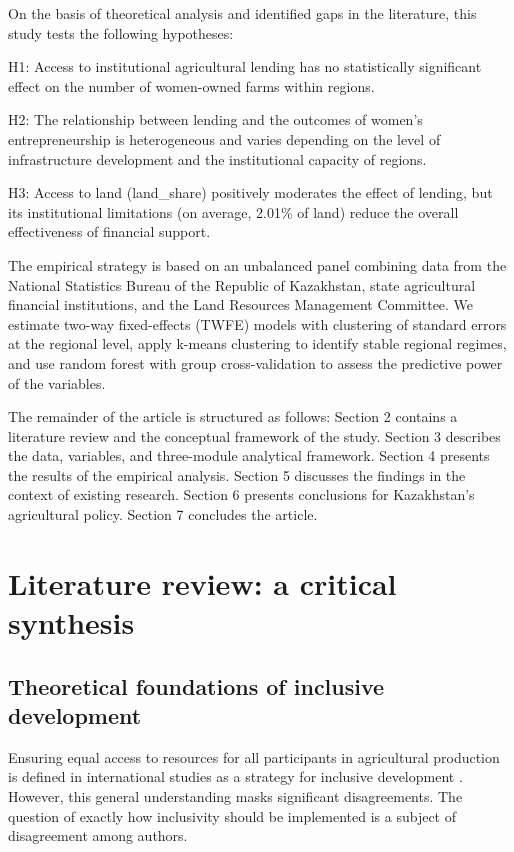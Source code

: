 ﻿\documentclass[pdflatex,sn-mathphys-ay]{sn-jnl}
\begin{document}
On the basis of theoretical analysis and identified gaps in the literature, this study tests the following hypotheses:

H1: Access to institutional agricultural lending has no statistically significant effect on the number of women-owned farms within regions.

H2: The relationship between lending and the outcomes of women's entrepreneurship is heterogeneous and varies depending on the level of infrastructure development and the institutional capacity of regions.

H3: Access to land (land\_share) positively moderates the effect of lending, but its institutional limitations (on average, 2.01\% of land) reduce the overall effectiveness of financial support.

The empirical strategy is based on an unbalanced panel combining data from the National Statistics Bureau of the Republic of Kazakhstan, state agricultural financial institutions, and the Land Resources Management Committee. We estimate two-way fixed-effects (TWFE) models with clustering of standard errors at the regional level, apply k-means clustering to identify stable regional regimes, and use random forest with group cross-validation to assess the predictive power of the variables.

The remainder of the article is structured as follows: Section 2 contains a literature review and the conceptual framework of the study. Section 3 describes the data, variables, and three-module analytical framework. Section 4 presents the results of the empirical analysis. Section 5 discusses the findings in the context of existing research. Section 6 presents conclusions for Kazakhstan's agricultural policy. Section 7 concludes the article.

\section{Literature review: a critical synthesis}

\subsection{Theoretical foundations of inclusive development}

Ensuring equal access to resources for all participants in agricultural
production is defined in international studies as a strategy for
inclusive development \citep{ref29,ref44,ref77}. However, this general understanding masks
significant disagreements. The question of exactly how inclusivity
should be implemented is a subject of disagreement among authors.
\end{document}
